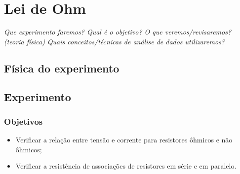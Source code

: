 \chapter{Lei de Ohm} %
\label{Chap:LeiDeOhm}        %

\begin{fullwidth}\it
	Que experimento faremos?
	Qual é o objetivo?
	O que veremos/revisaremos? (teoria física)
	Quais conceitos/técnicas de análise de dados utilizaremos?
\end{fullwidth}

\section{Física do experimento}


\section{Experimento}

\subsection{Objetivos}

\begin{itemize}
	\item Verificar a relação entre tensão e corrente para resistores ôhmicos e não ôhmicos;
	\item Verificar a resistência de associações de resistores em série e em paralelo.
\end{itemize}

